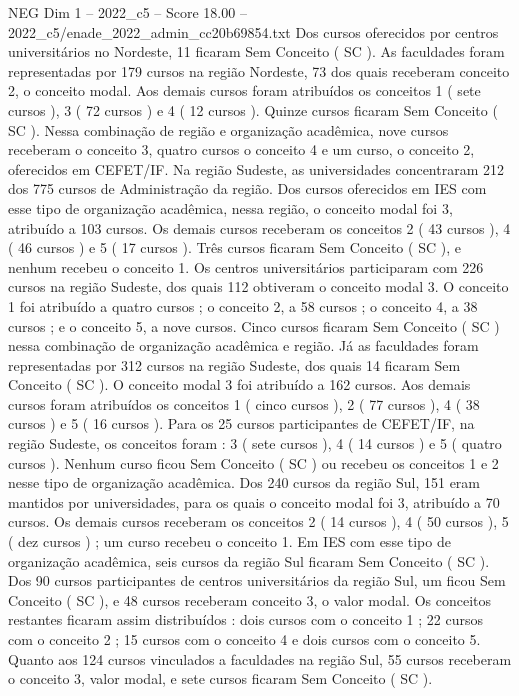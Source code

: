 \begin{textsample}{NEG Dim 1 – 2022\_c5 – Score 18.00 – 2022\_c5/enade\_2022\_admin\_cc20b69854.txt}
Dos cursos oferecidos por centros universitários no Nordeste, 11 ficaram Sem Conceito ( SC ).
As faculdades foram representadas por 179 cursos na região Nordeste, 73 dos quais receberam conceito 2, o conceito modal.
Aos demais cursos foram atribuídos os conceitos 1 ( sete cursos ), 3 ( 72 cursos ) e 4 ( 12 cursos ).
Quinze cursos ficaram Sem Conceito ( SC ).
Nessa combinação de região e organização acadêmica, nove cursos receberam o conceito 3, quatro cursos o conceito 4 e um curso, o conceito 2, oferecidos em CEFET/IF.
Na região Sudeste, as universidades concentraram 212 dos 775 cursos de Administração da região.
Dos cursos oferecidos em IES com esse tipo de organização acadêmica, nessa região, o conceito modal foi 3, atribuído a 103 cursos.
Os demais cursos receberam os conceitos 2 ( 43 cursos ), 4 ( 46 cursos ) e 5 ( 17 cursos ).
Três cursos ficaram Sem Conceito ( SC ), e nenhum recebeu o conceito 1.
Os centros universitários participaram com 226 cursos na região Sudeste, dos quais 112 obtiveram o conceito modal 3.
O conceito 1 foi atribuído a quatro cursos ; o conceito 2, a 58 cursos ; o conceito 4, a 38 cursos ; e o conceito 5, a nove cursos.
Cinco cursos ficaram Sem Conceito ( SC ) nessa combinação de organização acadêmica e região.
Já as faculdades foram representadas por 312 cursos na região Sudeste, dos quais 14 ficaram Sem Conceito ( SC ).
O conceito modal 3 foi atribuído a 162 cursos.
Aos demais cursos foram atribuídos os conceitos 1 ( cinco cursos ), 2 ( 77 cursos ), 4 ( 38 cursos ) e 5 ( 16 cursos ).
Para os 25 cursos participantes de CEFET/IF, na região Sudeste, os conceitos foram : 3 ( sete cursos ), 4 ( 14 cursos ) e 5 ( quatro cursos ).
Nenhum curso ficou Sem Conceito ( SC ) ou recebeu os conceitos 1 e 2 nesse tipo de organização acadêmica.
Dos 240 cursos da região Sul, 151 eram mantidos por universidades, para os quais o conceito modal foi 3, atribuído a 70 cursos.
Os demais cursos receberam os conceitos 2 ( 14 cursos ), 4 ( 50 cursos ), 5 ( dez cursos ) ; um curso recebeu o conceito 1.
Em IES com esse tipo de organização acadêmica, seis cursos da região Sul ficaram Sem Conceito ( SC ).
Dos 90 cursos participantes de centros universitários da região Sul, um ficou Sem Conceito ( SC ), e 48 cursos receberam conceito 3, o valor modal.
Os conceitos restantes ficaram assim distribuídos : dois cursos com o conceito 1 ; 22 cursos com o conceito 2 ; 15 cursos com o conceito 4 e dois cursos com o conceito 5.
Quanto aos 124 cursos vinculados a faculdades na região Sul, 55 cursos receberam o conceito 3, valor modal, e sete cursos ficaram Sem Conceito ( SC ).

\end{textsample}
